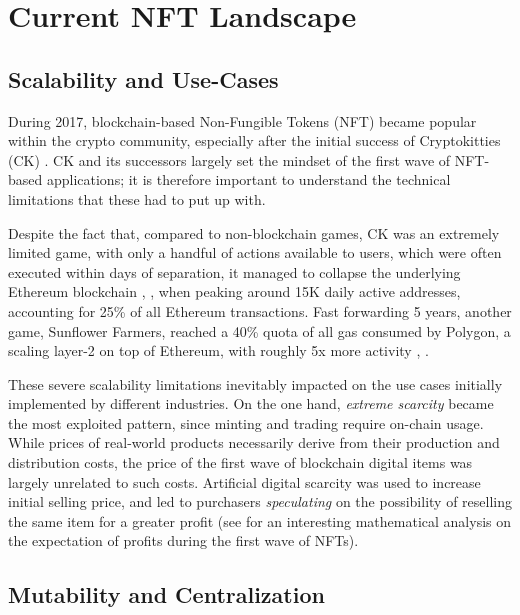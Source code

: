 \section{Current NFT Landscape}\label{introduction}

\subsection{Scalability and Use-Cases}\label{current-nfts}

During 2017, blockchain-based Non-Fungible Tokens (NFT) became popular within the crypto 
community, especially after the initial success of Cryptokitties (CK) \cite{kitties-contract}. 
CK and its successors largely set the mindset of the first wave of 
NFT-based applications; it is therefore important to understand the technical limitations that these
had to put up with.

Despite the fact that, compared to non-blockchain games, CK was an extremely limited game,
with only a handful of actions available to users, which were often executed within days of separation,
it managed to collapse the underlying Ethereum blockchain
\cite{buterin2013whitepaper}, \cite{jiang2021cryptokitties}, \cite{kitties-kraken}
when peaking around
15K daily active addresses, accounting for 25\% of all Ethereum transactions.
Fast forwarding 5 years, another game, Sunflower Farmers, reached a 40\% quota of all
gas consumed by Polygon, a scaling layer-2 on top of Ethereum, with roughly 5x more activity 
\cite{sunflower-play2earn}, \cite{sunflower-coindesk}.

These severe scalability limitations inevitably impacted on the use cases initially
implemented by different industries. On the one hand, {\it extreme scarcity} became the most exploited
pattern, since minting and trading require on-chain usage\cite{chohan2021non}.
While prices of real-world products necessarily derive from their production and
distribution costs, the price of the first wave of blockchain digital items was largely
unrelated to such costs. Artificial digital scarcity was used to increase initial selling
price, and led to purchasers {\it speculating} on 
the possibility of reselling the same item for a greater profit
(see \cite{pinto2022nft} for an interesting mathematical analysis on the expectation
of profits during the first wave of NFTs).

\subsection{Mutability and Centralization}\label{tokenURI}

